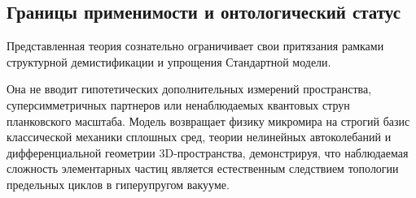 \documentclass[12pt,a4paper]{article}
\begin{document}
\subsection{Границы применимости и онтологический статус}
Представленная теория сознательно ограничивает свои притязания рамками структурной демистификации и упрощения Стандартной модели. 

Она не вводит гипотетических дополнительных измерений пространства, суперсимметричных партнеров или ненаблюдаемых квантовых струн планковского масштаба. Модель возвращает физику микромира на строгий базис классической механики сплошных сред, теории нелинейных автоколебаний и дифференциальной геометрии 3D-пространства, демонстрируя, что наблюдаемая сложность элементарных частиц является естественным следствием топологии предельных циклов в гиперупругом вакууме.
\end{document}
